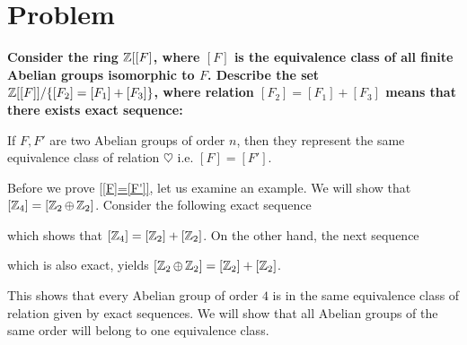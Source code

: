 \section{Problem}

{\bfseries%
  Consider the ring $\operatorname{\mathbb{Z}}[[F]$, where $[F]$ is the equivalence class of all finite Abelian groups isomorphic to $F$. Describe the set $\operatorname{\mathbb{Z}}[[F]]/\{[F_2]=[F_1]+[F_3]\}$, where relation $[F_2]=[F_1]+[F_3]$ means that there exists exact sequence:

  \begin{center}\end{center}
}

\begin{lemma}\label{[F]=[F']}
  If $F, F'$ are two Abelian groups of order $n$, then they represent the same equivalence class of relation $ \heartsuit $ i.e. $[F] = [F']$.
\end{lemma}

\begin{example}\label{Z2+Z2=Z4}
  Before we prove \cref{[F]=[F']}, let us examine an example. We will show that $[\operatorname{\mathbb{Z}}_4]=[\operatorname{\mathbb{Z}}_2\oplus\operatorname{\mathbb{Z}}_2]$. Consider the following exact sequence
  \begin{center}\end{center}
  which shows that $[\operatorname{\mathbb{Z}}_4]=[\operatorname{\mathbb{Z}}_2]+[\operatorname{\mathbb{Z}}_2]$. On the other hand, the next sequence
  \begin{center}\end{center}
  which is also exact, yields $[\operatorname{\mathbb{Z}}_2\oplus\operatorname{\mathbb{Z}}_2]=[\operatorname{\mathbb{Z}}_2]+[\operatorname{\mathbb{Z}}_2]$.

  This shows that every Abelian group of order $4$ is in the same equivalence class of relation given by exact sequences. We will show that all Abelian groups of the same order will belong to one equivalence class.
\end{example}

